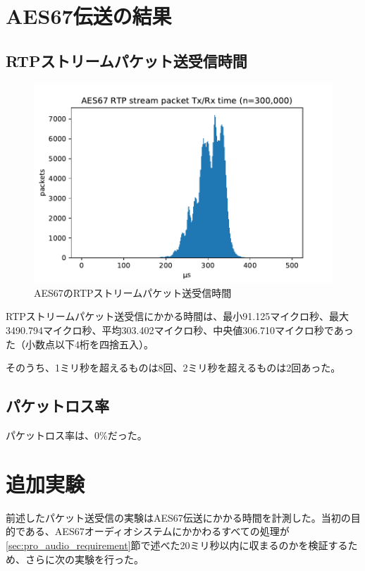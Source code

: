 \section{AES67伝送の結果}

\subsection{RTPストリームパケット送受信時間}

\begin{figure}[tbp]
  \centering
  \includegraphics[width=\linewidth]{img/packets_graph.pdf}
  \caption{AES67のRTPストリームパケット送受信時間}
  \label{fig:packets_graph}
\end{figure}

RTPストリームパケット送受信にかかる時間は、最小91.125マイクロ秒、最大3490.794マイクロ秒、平均303.402マイクロ秒、中央値306.710マイクロ秒であった（小数点以下4桁を四捨五入）。

そのうち、1ミリ秒を超えるものは8回、2ミリ秒を超えるものは2回あった。

\subsection{パケットロス率}

パケットロス率は、0\%だった。

\section{追加実験}

前述したパケット送受信の実験はAES67伝送にかかる時間を計測した。当初の目的である、AES67オーディオシステムにかかわるすべての処理が\ref{sec:pro_audio_requirement}節で述べた20ミリ秒以内に収まるのかを検証するため、さらに次の実験を行った。

